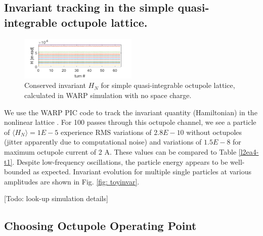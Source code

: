 \subsection{Invariant tracking in the simple quasi-integrable octupole lattice.}

\begin{figure}[]
   \centering
    \includegraphics[width=0.5\textwidth]{7.figures/HvsZ_crun1_toylattice.png}
 	\caption{Conserved invariant $H_N$ for simple quasi-integrable octupole lattice, calculated in WARP simulation with no space charge.}
   \label{fig:toyinvar}
\end{figure}

We use the WARP PIC code to track the invariant quantity (Hamiltonian) in the nonlinear lattice \cite{warp}. 
For 100 passes through this octupole channel, we see a particle of $\langle H_N\rangle =1E-5$ experience RMS variations of $2.8E-10$ without octupoles (jitter apparently due to computational noise) and variations of $1.5E-8$ for maximum octupole current of 2 A. These values can be compared to Table \ref{l2ea4-t1}. Despite low-frequency oscillations, the particle energy appears to be well-bounded as expected. Invariant evolution for multiple single particles at various amplitudes are shown in Fig. \ref{fig: toyinvar}. 

[Todo: look-up simulation details]




\subsection{Choosing Octupole Operating Point}


